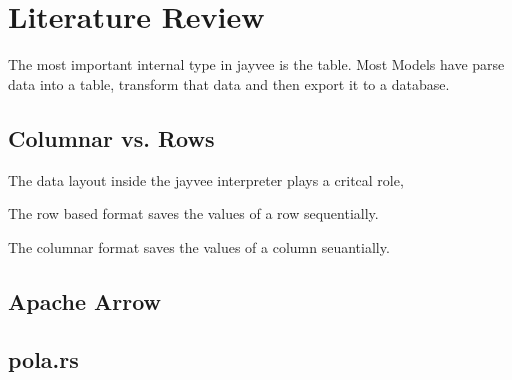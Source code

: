 \chapter{Literature Review}
\label{chapter:Literature}

The most important internal type in jayvee is the table. Most Models have parse data into a table, transform that data and then export it to a database.

\section{Columnar vs. Rows}
\label{section:column_vs_row}
The data layout inside the jayvee interpreter plays a critcal role,

The row based format saves the values of a row sequentially.

The columnar format saves the values of a column seuantially.



\section{Apache Arrow}
\label{section:arrow}

\section{pola.rs}
\label{section:polars}
